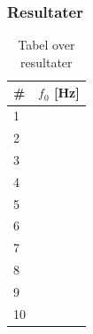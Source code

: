 	\subsubsection{Resultater}
	
	
			
		\begin{table}[]
\centering
\caption{Tabel over resultater}
\label{bordtest6resultater}
\begin{tabular}{l|l}
\textbf{\#}& \textbf{$f_{0}$ {[Hz]}} \\
\hline
1  &                  \\
2  &                  \\
3  &                  \\
4  &                  \\
5  &                  \\
6  &                  \\
7  &                  \\
8  &                  \\
9  &                  \\
10 &                 
\end{tabular}
\end{table}
			
	
		
	


		
	
	
	

	
